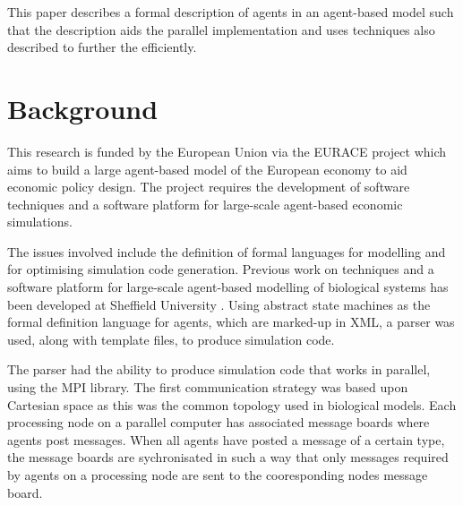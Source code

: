 \documentclass{aamas2009}
\begin{document}
This paper describes a formal description of agents in an agent-based model
such that the description aids the parallel implementation and uses techniques
also described to further the efficiently.



\section{Background}

This research is funded by the European Union via the EURACE project which aims
to build a large agent-based model of the European economy to aid economic
policy design. The project requires the development of software techniques and
a software platform for large-scale agent-based economic simulations.

The issues involved include the definition of formal languages for modelling
and for optimising simulation code generation. Previous work on techniques and
a software platform for large-scale agent-based modelling of biological systems
has been developed at Sheffield University \cite{179, 256, 221}. Using abstract state
machines as the formal definition language for agents, which are marked-up in
XML, a parser was used, along with template files, to produce simulation code.

The parser had the ability to produce simulation code that works in parallel,
using the MPI library. The first communication strategy was based upon Cartesian
space as this was the common topology used in biological models. Each
processing node on a parallel computer has associated message boards where
agents post messages. When all agents have posted a message of a certain type,
the message boards are sychronisated in such a way that only messages required
by agents on a processing node are sent to the cooresponding nodes message
board.
\end{document}
